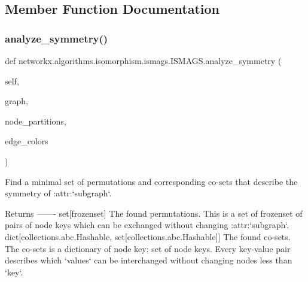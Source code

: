 \subsection{Member Function Documentation}
\mbox{\label{classnetworkx_1_1algorithms_1_1isomorphism_1_1ismags_1_1ISMAGS_a2047adf8ebd6af4319f2be87d7f0a2c7}} 
\subsubsection{\texorpdfstring{analyze\+\_\+symmetry()}{analyze\_symmetry()}}
{\footnotesize\ttfamily def networkx.\+algorithms.\+isomorphism.\+ismags.\+I\+S\+M\+A\+G\+S.\+analyze\+\_\+symmetry (\begin{DoxyParamCaption}\item[{}]{self,  }\item[{}]{graph,  }\item[{}]{node\+\_\+partitions,  }\item[{}]{edge\+\_\+colors }\end{DoxyParamCaption})}

\begin{DoxyVerb}Find a minimal set of permutations and corresponding co-sets that
describe the symmetry of :attr:`subgraph`.

Returns
-------
set[frozenset]
    The found permutations. This is a set of frozenset of pairs of node
    keys which can be exchanged without changing :attr:`subgraph`.
dict[collections.abc.Hashable, set[collections.abc.Hashable]]
    The found co-sets. The co-sets is a dictionary of {node key:
    set of node keys}. Every key-value pair describes which `values`
    can be interchanged without changing nodes less than `key`.
\end{DoxyVerb}
 \mbox{\label{classnetworkx_1_1algorithms_1_1isomorphism_1_1ismags_1_1ISMAGS_aee68cab930d165d0230de8ec1aa9b067}} 
